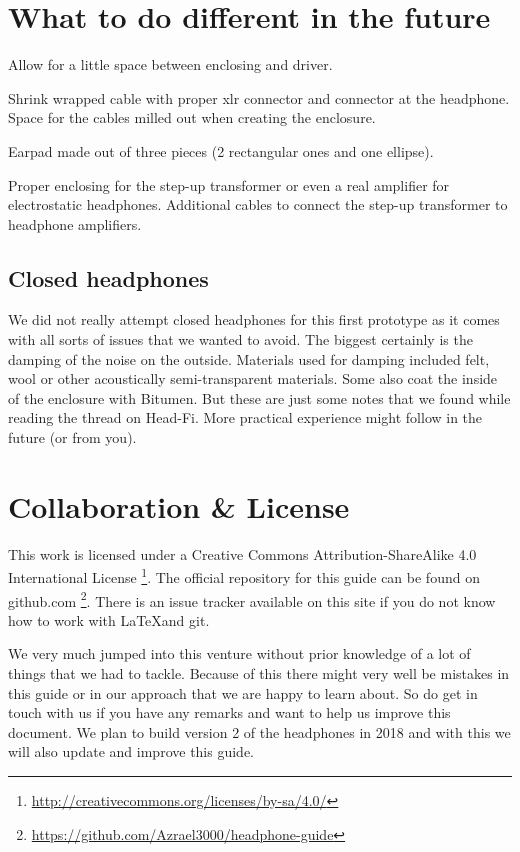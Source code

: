 \documentclass{article}
\begin{document}
\section{What to do different in the future}
\label{s:future}

Allow for a little space between enclosing and driver.

Shrink wrapped cable with proper xlr connector and connector at the headphone. Space for the cables milled out when creating the enclosure.

Earpad made out of three pieces (2 rectangular ones and one ellipse).

Proper enclosing for the step-up transformer or even a real amplifier for electrostatic headphones. Additional cables to connect the step-up transformer to headphone amplifiers.

\subsection{Closed headphones}
\label{s:future:closed}

We did not really attempt closed headphones for this first prototype as it comes with all sorts of issues that we wanted to avoid. The biggest certainly is the damping of the noise on the outside. Materials used for damping included felt, wool or other acoustically semi-transparent materials. Some also coat the inside of the enclosure with Bitumen. But these are just some notes that we found while reading the thread on Head-Fi. More practical experience might follow in the future (or from you).

\section{Collaboration \& License}
\label{s:collab}
This work is licensed under a Creative Commons Attribution-ShareAlike 4.0 International License \footnote{\url{http://creativecommons.org/licenses/by-sa/4.0/}}. The official repository for this guide can be found on github.com \footnote{\url{https://github.com/Azrael3000/headphone-guide}}. There is an issue tracker available on this site if you do not know how to work with \LaTeX and git.

We very much jumped into this venture without prior knowledge of a lot of things that we had to tackle. Because of this there might very well be mistakes in this guide or in our approach that we are happy to learn about. So do get in touch with us if you have any remarks and want to help us improve this document. We plan to build version 2 of the headphones in 2018 and with this we will also update and improve this guide.
\end{document}
